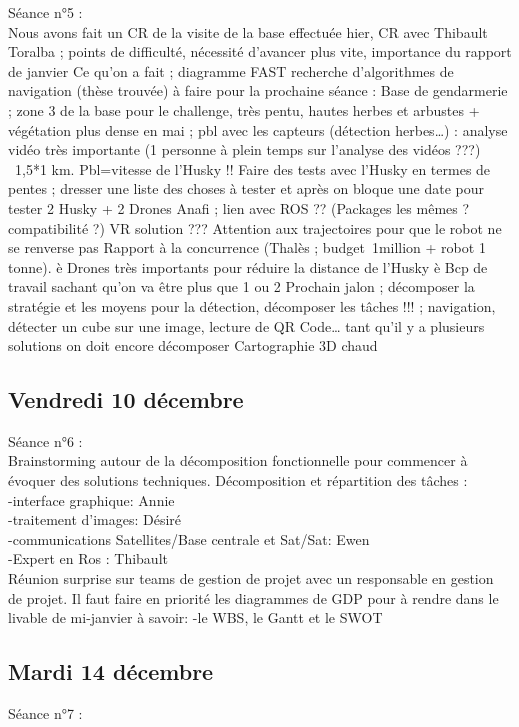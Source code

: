 \documentclass[11pt]{article}
\begin{document}
Séance n°5 :\\

Nous avons fait un  CR de la visite de la base effectuée hier, CR avec Thibault Toralba ; points de difficulté, nécessité d'avancer plus vite, importance du rapport de janvier
Ce qu’on a fait ; diagramme FAST
recherche d’algorithmes de navigation (thèse trouvée)
à faire pour la prochaine séance : 
Base de gendarmerie ; zone 3 de la base pour le challenge, très pentu, hautes herbes et arbustes + végétation plus dense en mai ; pbl avec les capteurs (détection herbes…) : analyse vidéo très importante (1 personne à plein temps sur l’analyse des vidéos ???)
~1,5*1 km. Pbl=vitesse de l’Husky !!
Faire des tests avec l’Husky en termes de pentes ; dresser une liste des choses à tester et après on bloque une date pour tester
2 Husky + 2 Drones Anafi ; lien avec ROS ?? (Packages les mêmes ? compatibilité ?)
VR solution ???
Attention aux trajectoires pour que le robot ne se renverse pas
Rapport à la concurrence (Thalès ; budget~1million + robot 1 tonne).
è Drones très importants pour réduire la distance de l’Husky
è Bcp de travail sachant qu’on va être plus que 1 ou 2
Prochain jalon ; décomposer la stratégie et les moyens pour la détection, décomposer les tâches !!! ; navigation, détecter un cube sur une image, lecture de QR Code… tant qu’il y a plusieurs solutions on doit encore décomposer
Cartographie 3D chaud
 
\subsection{Vendredi 10 décembre} 

Séance n°6 : \\

Brainstorming  autour de la décomposition fonctionnelle pour commencer à évoquer des solutions techniques. Décomposition et répartition des tâches :\\
-interface graphique: Annie\\
-traitement d’images: Désiré \\
-communications Satellites/Base centrale et Sat/Sat: Ewen \\
-Expert en Ros : Thibault \\

Réunion surprise sur teams de gestion de projet avec un responsable en gestion de projet. Il faut faire en priorité les diagrammes de GDP pour à rendre dans le livable de mi-janvier à savoir: -le WBS, le Gantt et le SWOT

\subsection{Mardi 14 décembre}
Séance n°7 : \\
\end{document}
